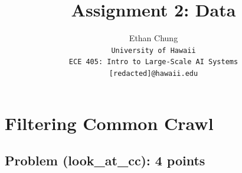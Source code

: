 \documentclass[letterpaper]{article}
\begin{document}
\title{Assignment 2: Data}

\author{Ethan Chung\\
    {\tt\small University of Hawaii}\\
    {\tt\small ECE 405: Intro to Large-Scale AI Systems}\\
    {\tt\small [redacted]@hawaii.edu}}

\maketitle

\tableofcontents

\newpage

\section{Filtering Common Crawl}

\subsection{Problem (look\_at\_cc): 4 points}
\end{document}
